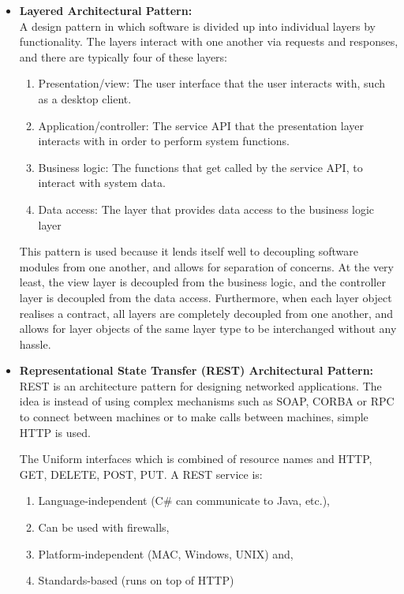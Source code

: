 \documentclass[a4paper,10pt]{article}
\begin{document}
\begin{itemize}
		\item \textbf{Layered Architectural Pattern:}\\
		A design pattern in which software is divided up into individual layers by functionality. The layers interact with one another via requests and responses, and there are typically four of these layers:
		\begin{enumerate}
			\item Presentation/view: The user interface that the user interacts with, such as a desktop client.
			\item Application/controller: The service API that the presentation layer interacts with in order to perform system functions.
			\item Business logic: The functions that get called by the service API, to interact with system data.
			\item Data access: The layer that provides data access to the business logic layer 
		\end{enumerate}
		
		This pattern is used because it lends itself well to decoupling software modules from one another, and allows for separation of concerns. At the very least, the view layer is decoupled from the business logic, and the controller layer is decoupled from the data access. Furthermore, when each layer object realises a contract, all layers are completely decoupled from one another, and allows for layer objects of the same layer type to be interchanged without any hassle. 
		
		\item \textbf{Representational State Transfer (REST) Architectural Pattern:}\\
		REST is an architecture pattern for designing networked applications. The idea is instead of using complex mechanisms such as SOAP, CORBA or RPC to connect between machines or to make calls between machines, simple HTTP is used.
		
		The Uniform interfaces which is combined of resource names and HTTP, GET, DELETE, POST, PUT.
			A REST service is:
		\begin{enumerate}
			\item Language-independent (C\# can communicate to Java, etc.),
			\item Can be used with firewalls,
			\item Platform-independent (MAC, Windows, UNIX) and,
			\item Standards-based (runs on top of HTTP)
		\end{enumerate}
		

\end{itemize}
\end{document}
